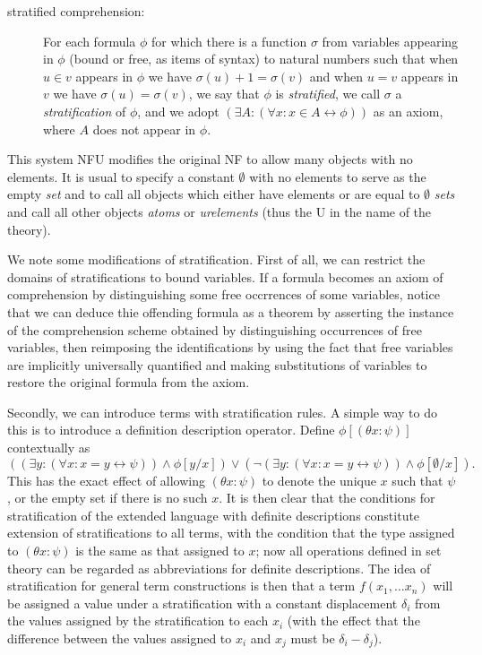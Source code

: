 \documentclass{article}
\begin{document}
{{\begin{description}
\item[stratified comprehension:]  For each formula $\phi$ for which there is a function $\sigma$ from variables appearing in $\phi$ (bound or free, as items of syntax) to natural numbers
such that when $u \in v$ appears in $\phi$ we have $\sigma(u)+1 = \sigma(v)$ and when $u=v$ appears in $v$ we have $\sigma(u)=\sigma(v)$, we say that $\phi$ is {\em stratified\/}, we call $\sigma$ a {\em stratification\/} of $\phi$, and we adopt $(\exists A:(\forall x:x \in A \leftrightarrow \phi))$ as an axiom, where $A$ does not appear in $\phi$.

\end{description}

This system NFU modifies the original NF to allow many objects with no elements.  It is usual to specify a constant $\emptyset$ with no elements to serve as the empty {\em set\/} and to call all objects which either have elements or are equal to $\emptyset$ {\em sets\/} and call all other objects {\em atoms\/} or {\em urelements\/} (thus the U in the name of the theory).

We note some modifications of stratification.  First of all, we can restrict the domains of stratifications to bound variables.  If a formula becomes an axiom of comprehension by
distinguishing some free occrrences of some variables, notice that we can deduce thie offending formula as a theorem by asserting the instance of the comprehension scheme obtained by distinguishing occurrences of free variables, then reimposing the identifications by using the fact that free variables are implicitly universally quantified and making substitutions of variables to restore the original formula from the axiom.

Secondly, we can introduce terms with stratification rules.  A simple way to do this is to introduce a definition description operator.  Define $\phi[(\theta x:\psi)]$ contextually
as $$((\exists y:(\forall x:x=y \leftrightarrow \psi)) \wedge \phi[y/x])\vee (\neg (\exists y:(\forall x:x=y \leftrightarrow \psi)) \wedge \phi[\emptyset/x]).$$  This has the exact effect of allowing $(\theta x:\psi)$ to denote the unique $x$ such that $\psi$, or the empty set if there is no such $x$.  It is then clear that the conditions for stratification of the extended language with definite descriptions constitute extension of stratifications to all terms, with the condition that the type assigned to $(\theta x:\psi)$ is the same as that assigned to $x$;  now all operations defined in set theory can be regarded as abbreviations for definite descriptions.  The idea of stratification for general term constructions is then that
a term $f(x_1,\ldots x_n)$ will be assigned a value under a stratification with a constant displacement $\delta_i$ from the values assigned by the stratification to each $x_i$
(with the effect that the difference between the values assigned to $x_i$ and $x_j$ must be $\delta_i -\delta_j$).

}}
\end{document}
